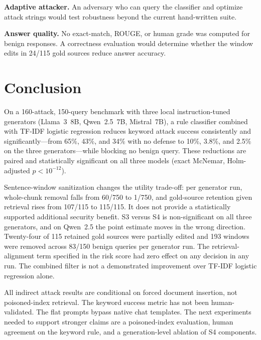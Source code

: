 \documentclass[journal]{IEEEtran}
\begin{document}
\textbf{Adaptive attacker.} An adversary who can query the classifier and
optimize attack strings would test robustness beyond the current hand-written
suite.

\textbf{Answer quality.} No exact-match, ROUGE, or human grade was computed for
benign responses. A correctness evaluation would determine whether the window
edits in 24/115 gold sources reduce answer accuracy.

\section{Conclusion}
\label{sec:conclusion}

On a 160-attack, 150-query benchmark with three local instruction-tuned
generators (Llama~3~8B, Qwen~2.5~7B, Mistral~7B), a rule classifier combined
with TF-IDF logistic regression reduces keyword attack success consistently and
significantly---from 65\%, 43\%, and 34\% with no defense to 10\%, 3.8\%, and
2.5\% on the three generators---while blocking no benign query. These reductions
are paired and statistically significant on all three models (exact McNemar,
Holm-adjusted $p < 10^{-12}$).

Sentence-window sanitization changes the utility trade-off: per generator run,
whole-chunk removal falls from 60/750 to 1/750, and gold-source retention given
retrieval rises from 107/115 to 115/115. It does not provide a statistically
supported additional security benefit. S3 versus S4 is non-significant on all
three generators, and on Qwen~2.5 the point estimate moves in the wrong
direction. Twenty-four of 115 retained gold sources were partially edited and 193
windows were removed across 83/150 benign queries per generator run. The
retrieval-alignment term specified in the risk score had zero effect on any
decision in any run. The combined filter is not a demonstrated improvement over
TF-IDF logistic regression alone.

All indirect attack results are conditional on forced document insertion, not
poisoned-index retrieval. The keyword success metric has not been human-validated.
The flat prompts bypass native chat templates. The next experiments needed to
support stronger claims are a poisoned-index evaluation, human agreement on the
keyword rule, and a generation-level ablation of S4 components.

\end{document}
